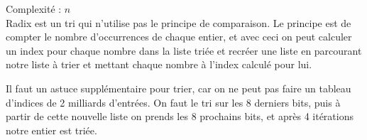 \label{Radix}
\footnotesize 
\noindent
Complexité :  $n$
\\
\normalsize
Radix est un tri qui n'utilise pas le principe de comparaison.
Le principe est de compter le nombre d'occurrences de chaque entier, et avec ceci on peut calculer un index pour chaque nombre dans la liste triée et recréer une liste en parcourant notre liste à trier et mettant chaque nombre à l'index calculé pour lui.

Il faut un astuce supplémentaire pour trier, car on ne peut pas faire un tableau d'indices de 2 milliards d'entrées. On faut le tri sur les 8 derniers bits, puis à partir de cette nouvelle liste on prends les 8 prochains bits, et après 4 itérations notre entier est triée.